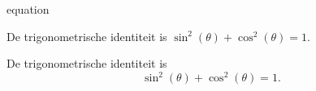 \documentclass[../presentatie.tex]{subfiles}
\begin{document}


\begin{saveblock}{equation}
	\begin{highlightblock}[gobble=8,linewidth=\textwidth,
		framexleftmargin=0.25em,xleftmargin=0.25em]
		De trigonometrische identiteit is
		$ \sin^2(\theta) + \cos^2(\theta) = 1. $

		De trigonometrische identiteit is 
		\begin{equation}
			\sin^2(\theta) + \cos^2(\theta) = 1.
		\end{equation}
	\end{highlightblock}
\end{saveblock}

\end{document}
